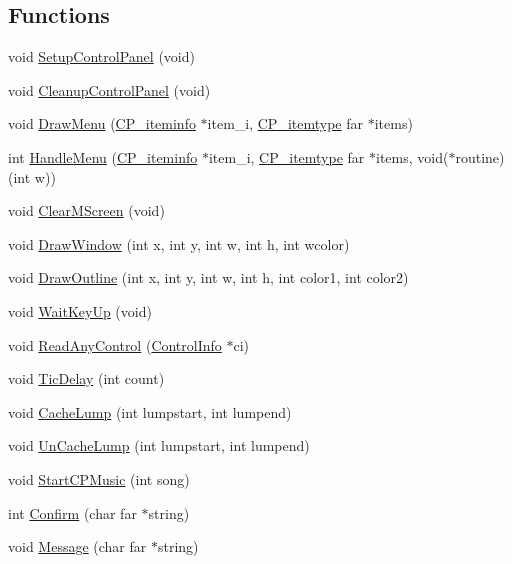 \subsection*{Functions}
\begin{DoxyCompactItemize}
\item 
void \hyperlink{WL__MENU_8H_a3c358410161fc65eb8b58e7e7e47b409}{SetupControlPanel} (void)
\item 
void \hyperlink{WL__MENU_8H_adaff6c2a2e08ddb9a2e1bc122ea0c546}{CleanupControlPanel} (void)
\item 
void \hyperlink{WL__MENU_8H_ad7ae5f8d3bfaf8e94d9c3fd004609229}{DrawMenu} (\hyperlink{structCP__iteminfo}{CP\_\-iteminfo} $\ast$item\_\-i, \hyperlink{structCP__itemtype}{CP\_\-itemtype} far $\ast$items)
\item 
int \hyperlink{WL__MENU_8H_ad290f8e33560355805666460ffa302b0}{HandleMenu} (\hyperlink{structCP__iteminfo}{CP\_\-iteminfo} $\ast$item\_\-i, \hyperlink{structCP__itemtype}{CP\_\-itemtype} far $\ast$items, void($\ast$routine)(int w))
\item 
void \hyperlink{WL__MENU_8H_a7a8e53f3f469cbf79c3f55807761d3bb}{ClearMScreen} (void)
\item 
void \hyperlink{WL__MENU_8H_a904e939ab3e905847095245ec694d845}{DrawWindow} (int x, int y, int w, int h, int wcolor)
\item 
void \hyperlink{WL__MENU_8H_a932353c4f637452b49ee6e1a4c382bf5}{DrawOutline} (int x, int y, int w, int h, int color1, int color2)
\item 
void \hyperlink{WL__MENU_8H_a3434990df52efeb93017e54af5a20860}{WaitKeyUp} (void)
\item 
void \hyperlink{WL__MENU_8H_a203c5a4b291ebd6bf7b0fb11b5905e6c}{ReadAnyControl} (\hyperlink{structCursorInfo}{ControlInfo} $\ast$ci)
\item 
void \hyperlink{WL__MENU_8H_a4f5f54a27864fe7144f735c2d3529774}{TicDelay} (int count)
\item 
void \hyperlink{WL__MENU_8H_a03aae71ea1eb201f2e7e4b0408c1c426}{CacheLump} (int lumpstart, int lumpend)
\item 
void \hyperlink{WL__MENU_8H_ae68019294ac4f3a9df949035a4c36cf8}{UnCacheLump} (int lumpstart, int lumpend)
\item 
void \hyperlink{WL__MENU_8H_a4f6ff7d7af8823a0cd9a4a7217a151de}{StartCPMusic} (int song)
\item 
int \hyperlink{WL__MENU_8H_a03f63a618731c692b7496b92fa2002bd}{Confirm} (char far $\ast$string)
\item 
void \hyperlink{WL__MENU_8H_a42108cf0eef44550e9428222e11de2a3}{Message} (char far $\ast$string)

\end{DoxyCompactItemize}
